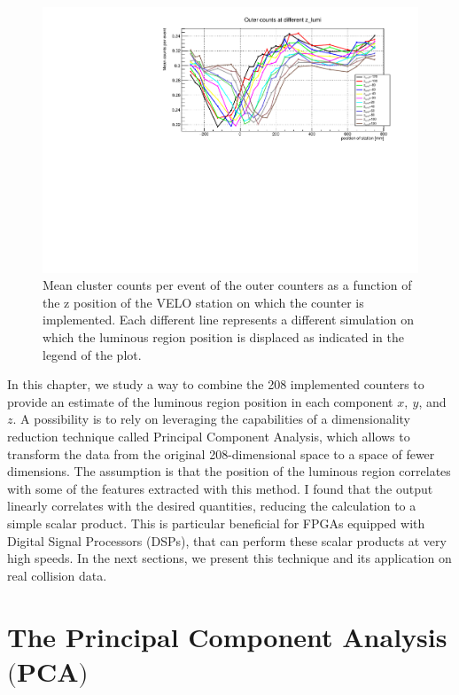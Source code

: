\begin{figure}
    \centering
    \includegraphics[width=\textwidth]{figures/z_lumi_dependency.pdf}
    \caption{Mean cluster counts per event of the outer counters as a function of the z position of the VELO station on which the counter is implemented. Each different line represents a different simulation on which the luminous region position is displaced as indicated in the legend of the plot.}
    \label{fig:z_lumi_dependency}
\end{figure}

In this chapter, we study a way to combine the 208 implemented counters to provide an estimate of the luminous region position in each component $x,\ y$, and $z$. A possibility is to rely on leveraging the capabilities of a dimensionality reduction technique called Principal Component Analysis, which allows to transform the data from the original 208-dimensional space to a space of fewer dimensions. The assumption is that the position of the luminous region correlates with some of the features extracted with this method. I found that the output linearly correlates with the desired quantities, reducing the calculation to a simple scalar product. This is particular beneficial for FPGAs equipped with Digital Signal Processors (DSPs), that can perform these scalar products at very high speeds. In the next sections, we present this technique 
and its application on real collision data.



\section[The Principal Component Analysis]{The Principal Component Analysis $\bigl($PCA$\bigr)$}\label{sec:PCA}

